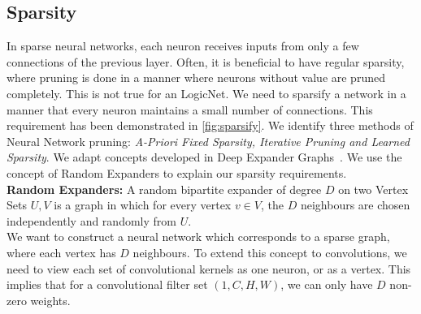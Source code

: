 \subsection{Sparsity}
In sparse neural networks, each neuron receives inputs from only a few connections of the previous layer. Often, it is beneficial to have regular sparsity, where pruning is done in a manner where neurons without value are pruned completely. This is not true for an LogicNet. We need to sparsify a network in a manner that every neuron maintains a small number of connections. This requirement has been demonstrated in \cref{fig:sparsify}. We identify three methods of Neural Network pruning: \textit{A-Priori Fixed Sparsity, Iterative Pruning and Learned Sparsity}. 
We adapt concepts developed in Deep Expander Graphs~\cite{prabhu2018deep}. We use the concept of Random Expanders to explain our sparsity requirements. \\
\textbf{Random Expanders:} A random bipartite expander of degree $D$ on two Vertex Sets $U, V$ is a graph in which for every vertex $v \in V$, the $D$ neighbours are chosen independently and randomly from $U$.\\
We want to construct a neural network which corresponds to a sparse graph, where each vertex has $D$ neighbours. To extend this concept to convolutions, we need to view each set of convolutional kernels as one neuron, or as a vertex. This implies that for a convolutional filter set $(1, C, H, W)$, we can only have $D$ non-zero weights. 

